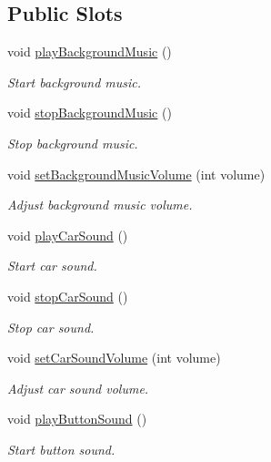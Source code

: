 \subsection*{Public Slots}
\begin{DoxyCompactItemize}
\item 
void \mbox{\hyperlink{class_sound_a38ddfc508820823a97a447bbcf13cdd6}{play\+Background\+Music}} ()
\begin{DoxyCompactList}\small\item\em Start background music. \end{DoxyCompactList}\item 
void \mbox{\hyperlink{class_sound_a1f3858c62f1f8579eaa708df8c979890}{stop\+Background\+Music}} ()
\begin{DoxyCompactList}\small\item\em Stop background music. \end{DoxyCompactList}\item 
void \mbox{\hyperlink{class_sound_a983f09cee9134f759620518b4c73ca8d}{set\+Background\+Music\+Volume}} (int volume)
\begin{DoxyCompactList}\small\item\em Adjust background music volume. \end{DoxyCompactList}\item 
void \mbox{\hyperlink{class_sound_a990af8a6d794d159979c1e7b0a3bc2cd}{play\+Car\+Sound}} ()
\begin{DoxyCompactList}\small\item\em Start car sound. \end{DoxyCompactList}\item 
void \mbox{\hyperlink{class_sound_abd13dcd036641d8e53a9b9426bd5f6eb}{stop\+Car\+Sound}} ()
\begin{DoxyCompactList}\small\item\em Stop car sound. \end{DoxyCompactList}\item 
void \mbox{\hyperlink{class_sound_afe4fc54be7b910501ae27c691fe4f300}{set\+Car\+Sound\+Volume}} (int volume)
\begin{DoxyCompactList}\small\item\em Adjust car sound volume. \end{DoxyCompactList}\item 
void \mbox{\hyperlink{class_sound_a0e86fca0cb1a60f07e93d58cda639d91}{play\+Button\+Sound}} ()
\begin{DoxyCompactList}\small\item\em Start button sound. \end{DoxyCompactList}\item 

\end{DoxyCompactItemize}
